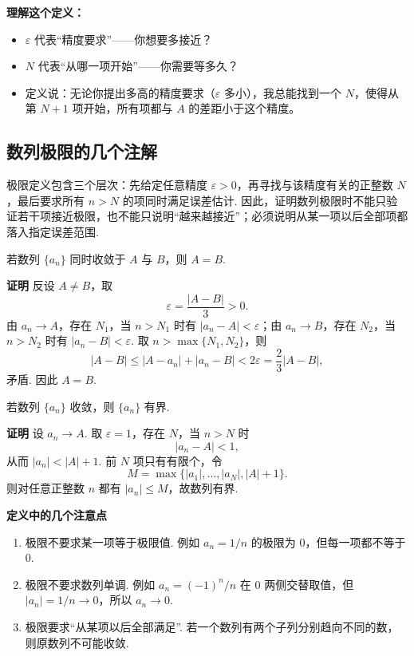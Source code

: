 \documentclass[fontset=fandol]{ctexart}
\newenvironment{custom}[1]{\par\noindent\textbf{#1}\quad}{\par\vspace{0.8em}}
\begin{document}
\textbf{理解这个定义：}
\begin{itemize}
\item \(\varepsilon\) 代表“精度要求”——你想要多接近？
\item \(N\) 代表“从哪一项开始”——你需要等多久？
\item 定义说：无论你提出多高的精度要求（\(\varepsilon\) 多小），我总能找到一个 \(N\)，使得从第 \(N+1\) 项开始，所有项都与 \(A\) 的差距小于这个精度。
\end{itemize}

\subsection{数列极限的几个注解}

极限定义包含三个层次：先给定任意精度 $\varepsilon>0$，再寻找与该精度有关的正整数 $N$，最后要求所有 $n>N$ 的项同时满足误差估计. 因此，证明数列极限时不能只验证若干项接近极限，也不能只说明“越来越接近”；必须说明从某一项以后全部项都落入指定误差范围.

\begin{proposition}[极限唯一性]
若数列 $\{a_n\}$ 同时收敛于 $A$ 与 $B$，则 $A=B$.
\end{proposition}
\begin{custom}{证明}
反设 $A\ne B$，取
\[
\varepsilon=\frac{|A-B|}{3}>0.
\]
由 $a_n\to A$，存在 $N_1$，当 $n>N_1$ 时有 $|a_n-A|<\varepsilon$；由 $a_n\to B$，存在 $N_2$，当 $n>N_2$ 时有 $|a_n-B|<\varepsilon$. 取 $n>\max\{N_1,N_2\}$，则
\[
|A-B|\le |A-a_n|+|a_n-B|<2\varepsilon=\frac{2}{3}|A-B|,
\]
矛盾. 因此 $A=B$.
\end{custom}

\begin{proposition}[收敛数列有界]
若数列 $\{a_n\}$ 收敛，则 $\{a_n\}$ 有界.
\end{proposition}
\begin{custom}{证明}
设 $a_n\to A$. 取 $\varepsilon=1$，存在 $N$，当 $n>N$ 时
\[
|a_n-A|<1,
\]
从而 $|a_n|<|A|+1$. 前 $N$ 项只有有限个，令
\[
M=\max\{|a_1|,\ldots,|a_N|,|A|+1\}.
\]
则对任意正整数 $n$ 都有 $|a_n|\le M$，故数列有界.
\end{custom}

\begin{custom}{定义中的几个注意点}
\begin{enumerate}
\item 极限不要求某一项等于极限值. 例如 $a_n=1/n$ 的极限为 $0$，但每一项都不等于 $0$.
\item 极限不要求数列单调. 例如 $a_n=(-1)^n/n$ 在 $0$ 两侧交替取值，但 $|a_n|=1/n\to0$，所以 $a_n\to0$.
\item 极限要求“从某项以后全部满足”. 若一个数列有两个子列分别趋向不同的数，则原数列不可能收敛.
\end{enumerate}
\end{custom}
\end{document}
